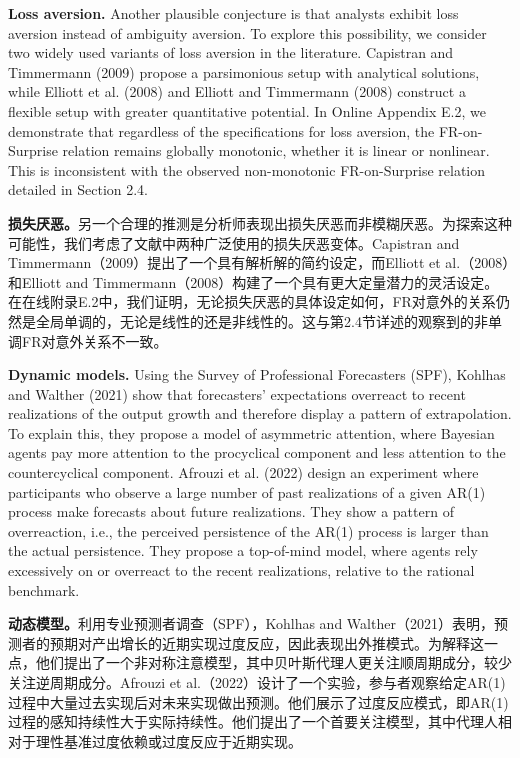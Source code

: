 \documentclass[12pt,a4paper]{article}
\newenvironment{original}
  {\par\medskip\noindent\ignorespaces}
  {\par\medskip}
\newenvironment{translation}
  {\par\noindent{\color{transblue}\ignorespaces}}
  {\par\bigskip}
\begin{document}
\begin{original}
\textbf{Loss aversion.} Another plausible conjecture is that analysts exhibit loss aversion instead of ambiguity aversion. To explore this possibility, we consider two widely used variants of loss aversion in the literature. Capistran and Timmermann (2009) propose a parsimonious setup with analytical solutions, while Elliott et al. (2008) and Elliott and Timmermann (2008) construct a flexible setup with greater quantitative potential. In Online Appendix E.2, we demonstrate that regardless of the specifications for loss aversion, the FR-on-Surprise relation remains globally monotonic, whether it is linear or nonlinear. This is inconsistent with the observed non-monotonic FR-on-Surprise relation detailed in Section 2.4.
\end{original}
\begin{translation}
\textbf{损失厌恶。}另一个合理的推测是分析师表现出损失厌恶而非模糊厌恶。为探索这种可能性，我们考虑了文献中两种广泛使用的损失厌恶变体。Capistran and Timmermann（2009）提出了一个具有解析解的简约设定，而Elliott et al.（2008）和Elliott and Timmermann（2008）构建了一个具有更大定量潜力的灵活设定。在在线附录E.2中，我们证明，无论损失厌恶的具体设定如何，FR对意外的关系仍然是全局单调的，无论是线性的还是非线性的。这与第2.4节详述的观察到的非单调FR对意外关系不一致。
\end{translation}

\begin{original}
\textbf{Dynamic models.} Using the Survey of Professional Forecasters (SPF), Kohlhas and Walther (2021) show that forecasters' expectations overreact to recent realizations of the output growth and therefore display a pattern of extrapolation. To explain this, they propose a model of asymmetric attention, where Bayesian agents pay more attention to the procyclical component and less attention to the countercyclical component. Afrouzi et al. (2022) design an experiment where participants who observe a large number of past realizations of a given AR(1) process make forecasts about future realizations. They show a pattern of overreaction, i.e., the perceived persistence of the AR(1) process is larger than the actual persistence. They propose a top-of-mind model, where agents rely excessively on or overreact to the recent realizations, relative to the rational benchmark.
\end{original}
\begin{translation}
\textbf{动态模型。}利用专业预测者调查（SPF），Kohlhas and Walther（2021）表明，预测者的预期对产出增长的近期实现过度反应，因此表现出外推模式。为解释这一点，他们提出了一个非对称注意模型，其中贝叶斯代理人更关注顺周期成分，较少关注逆周期成分。Afrouzi et al.（2022）设计了一个实验，参与者观察给定AR(1)过程中大量过去实现后对未来实现做出预测。他们展示了过度反应模式，即AR(1)过程的感知持续性大于实际持续性。他们提出了一个首要关注模型，其中代理人相对于理性基准过度依赖或过度反应于近期实现。
\end{translation}
\end{document}
